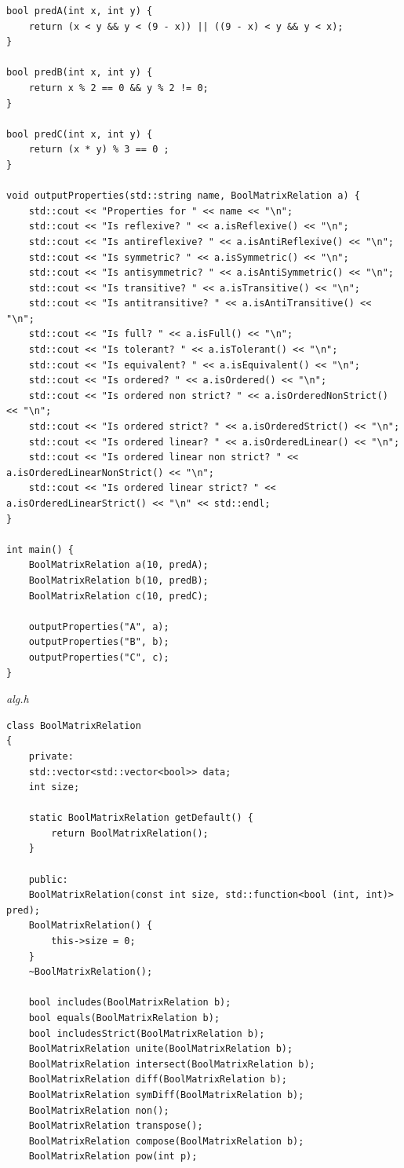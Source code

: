 \documentclass[a4paper,14pt]{extarticle}
\begin{document}
\begin{enumerate}[label=2.\arabic*.]
\begin{verbatim}
bool predA(int x, int y) {
	return (x < y && y < (9 - x)) || ((9 - x) < y && y < x);
}

bool predB(int x, int y) {
	return x % 2 == 0 && y % 2 != 0;
}

bool predC(int x, int y) {
	return (x * y) % 3 == 0 ;
}

void outputProperties(std::string name, BoolMatrixRelation a) {
	std::cout << "Properties for " << name << "\n";
	std::cout << "Is reflexive? " << a.isReflexive() << "\n";
	std::cout << "Is antireflexive? " << a.isAntiReflexive() << "\n";
	std::cout << "Is symmetric? " << a.isSymmetric() << "\n";
	std::cout << "Is antisymmetric? " << a.isAntiSymmetric() << "\n";
	std::cout << "Is transitive? " << a.isTransitive() << "\n";
	std::cout << "Is antitransitive? " << a.isAntiTransitive() << "\n";
	std::cout << "Is full? " << a.isFull() << "\n";
	std::cout << "Is tolerant? " << a.isTolerant() << "\n";
	std::cout << "Is equivalent? " << a.isEquivalent() << "\n";
	std::cout << "Is ordered? " << a.isOrdered() << "\n";
	std::cout << "Is ordered non strict? " << a.isOrderedNonStrict() << "\n";
	std::cout << "Is ordered strict? " << a.isOrderedStrict() << "\n";
	std::cout << "Is ordered linear? " << a.isOrderedLinear() << "\n";
	std::cout << "Is ordered linear non strict? " << a.isOrderedLinearNonStrict() << "\n";
	std::cout << "Is ordered linear strict? " << a.isOrderedLinearStrict() << "\n" << std::endl;
}

int main() {
	BoolMatrixRelation a(10, predA);
	BoolMatrixRelation b(10, predB);
	BoolMatrixRelation c(10, predC);
	
	outputProperties("A", a);
	outputProperties("B", b);
	outputProperties("C", c);
}
    	\end{verbatim}
	      \textit{alg.h}
	      \begin{verbatim}
class BoolMatrixRelation
{
	private:
	std::vector<std::vector<bool>> data;
	int size;
	
	static BoolMatrixRelation getDefault() {
		return BoolMatrixRelation();
	}
	
	public:
	BoolMatrixRelation(const int size, std::function<bool (int, int)> pred);
	BoolMatrixRelation() {
		this->size = 0;
	}
	~BoolMatrixRelation();
	
	bool includes(BoolMatrixRelation b);
	bool equals(BoolMatrixRelation b);
	bool includesStrict(BoolMatrixRelation b);
	BoolMatrixRelation unite(BoolMatrixRelation b);
	BoolMatrixRelation intersect(BoolMatrixRelation b);
	BoolMatrixRelation diff(BoolMatrixRelation b);
	BoolMatrixRelation symDiff(BoolMatrixRelation b);
	BoolMatrixRelation non();
	BoolMatrixRelation transpose();
	BoolMatrixRelation compose(BoolMatrixRelation b);
	BoolMatrixRelation pow(int p);
	

\end{verbatim}
\end{enumerate}
\end{document}
